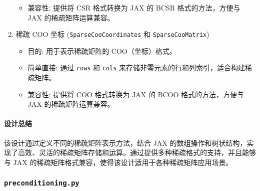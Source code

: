 \documentclass{ctexart}
\begin{document}
\begin{enumerate}
\begin{itemize}
		      \item 兼容性: 提供将 CSR 格式转换为 JAX 的 BCSR 格式的方法，方便与 JAX 的稀疏矩阵运算兼容。
	      \end{itemize}

	\item 稀疏 COO 坐标 (\texttt{SparseCooCoordinates} 和 \texttt{SparseCooMatrix})

	      \begin{itemize}
		      \item 目的: 用于表示稀疏矩阵的 COO（坐标）格式。

		      \item 简单直接: 通过 \texttt{rows} 和 \texttt{cols} 来存储非零元素的行和列索引，适合构建稀疏矩阵。

		      \item 兼容性: 提供将 COO 格式转换为 JAX 的 BCOO 格式的方法，方便与 JAX 的稀疏矩阵运算兼容。
	      \end{itemize}
\end{enumerate}

\paragraph{设计总结}

该设计通过定义不同的稀疏矩阵表示方法，结合 JAX 的数组操作和树状结构，实现了高效、灵活的稀疏矩阵存储和运算。通过提供多种稀疏格式的支持，并且能够与 JAX 的稀疏矩阵格式兼容，使得该设计适用于各种稀疏矩阵应用场景。

\subsubsection{\texttt{preconditioning.py}}
\end{document}

